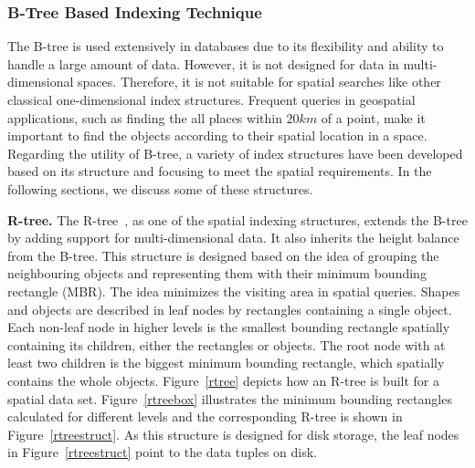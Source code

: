 \documentclass[a4paper,12pt]{article}
\begin{document}
 


\subsubsection{B-Tree Based Indexing Technique}
\label{b-tree-based}
The B-tree is used extensively in databases due to its flexibility and ability to handle a large amount of data. However, it is not designed for data in multi-dimensional spaces. Therefore, it is not suitable for spatial searches like other classical one-dimensional index structures. Frequent queries in geospatial applications, such as finding the all places within $20 km$ of a point, make it important to find the objects according to their spatial location in a space. Regarding the utility of B-tree, a variety of index structures have been developed based on its structure and focusing to meet the spatial requirements. In the following sections, we discuss some of these structures.

\textbf{R-tree.} The R-tree~\cite{rtree}, as one of the spatial indexing structures, extends the B-tree by adding support for multi-dimensional data. It also inherits the height balance from the B-tree. This structure is designed based on the idea of grouping the neighbouring objects and representing them with their minimum bounding rectangle (MBR). The idea minimizes the visiting area in spatial queries. Shapes and objects are described in leaf nodes by rectangles containing a single object. Each non-leaf node in higher levels is the smallest bounding rectangle spatially containing its children, either the rectangles or objects. The root node with at least two children is the biggest minimum bounding rectangle, which spatially contains the whole objects. Figure~\ref{rtree} depicts how an R-tree is built for a spatial data set. Figure~\ref{rtreebox} illustrates the minimum bounding rectangles calculated for different levels
and the corresponding R-tree is shown in Figure~\ref{rtreestruct}.
As this structure is designed for disk storage, the leaf nodes in Figure~\ref{rtreestruct} point to the data tuples on disk.
\end{document}
